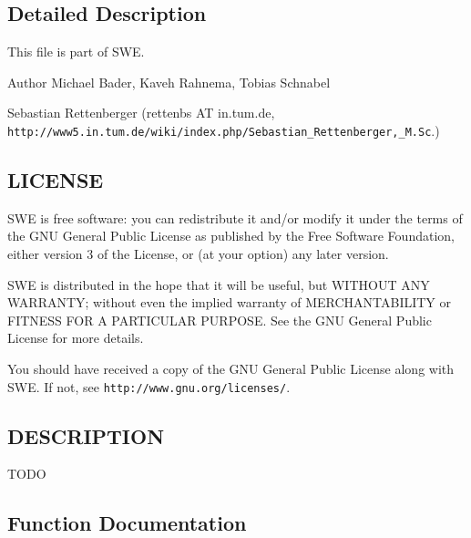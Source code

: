\subsection{Detailed Description}
This file is part of S\-W\-E.

\begin{DoxyAuthor}{Author}
Michael Bader, Kaveh Rahnema, Tobias Schnabel 

Sebastian Rettenberger (rettenbs A\-T in.\-tum.\-de, {\tt http\-://www5.\-in.\-tum.\-de/wiki/index.\-php/\-Sebastian\-\_\-\-Rettenberger,\-\_\-\-M.\-Sc}.)
\end{DoxyAuthor}
\subsection{L\-I\-C\-E\-N\-S\-E}\label{Writer_8hh_LICENSE}
S\-W\-E is free software\-: you can redistribute it and/or modify it under the terms of the G\-N\-U General Public License as published by the Free Software Foundation, either version 3 of the License, or (at your option) any later version.

S\-W\-E is distributed in the hope that it will be useful, but W\-I\-T\-H\-O\-U\-T A\-N\-Y W\-A\-R\-R\-A\-N\-T\-Y; without even the implied warranty of M\-E\-R\-C\-H\-A\-N\-T\-A\-B\-I\-L\-I\-T\-Y or F\-I\-T\-N\-E\-S\-S F\-O\-R A P\-A\-R\-T\-I\-C\-U\-L\-A\-R P\-U\-R\-P\-O\-S\-E. See the G\-N\-U General Public License for more details.

You should have received a copy of the G\-N\-U General Public License along with S\-W\-E. If not, see {\tt http\-://www.\-gnu.\-org/licenses/}.\subsection{D\-E\-S\-C\-R\-I\-P\-T\-I\-O\-N}\label{NetCdfWriter_8hh_DESCRIPTION}
T\-O\-D\-O 

\subsection{Function Documentation}
